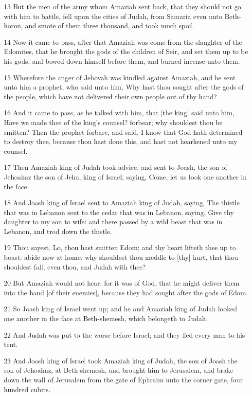 \par 13 But the men of the army whom Amaziah sent back, that they should not go with him to battle, fell upon the cities of Judah, from Samaria even unto Beth-horon, and smote of them three thousand, and took much spoil.
\par 14 Now it came to pass, after that Amaziah was come from the slaughter of the Edomites, that he brought the gods of the children of Seir, and set them up to be his gods, and bowed down himself before them, and burned incense unto them.
\par 15 Wherefore the anger of Jehovah was kindled against Amaziah, and he sent unto him a prophet, who said unto him, Why hast thou sought after the gods of the people, which have not delivered their own people out of thy hand?
\par 16 And it came to pass, as he talked with him, that [the king] said unto him, Have we made thee of the king's counsel? forbear; why shouldest thou be smitten? Then the prophet forbare, and said, I know that God hath determined to destroy thee, because thou hast done this, and hast not hearkened unto my counsel.
\par 17 Then Amaziah king of Judah took advice, and sent to Joash, the son of Jehoahaz the son of Jehu, king of Israel, saying, Come, let us look one another in the face.
\par 18 And Joash king of Israel sent to Amaziah king of Judah, saying, The thistle that was in Lebanon sent to the cedar that was in Lebanon, saying, Give thy daughter to my son to wife: and there passed by a wild beast that was in Lebanon, and trod down the thistle.
\par 19 Thou sayest, Lo, thou hast smitten Edom; and thy heart lifteth thee up to boast: abide now at home; why shouldest thou meddle to [thy] hurt, that thou shouldest fall, even thou, and Judah with thee?
\par 20 But Amaziah would not hear; for it was of God, that he might deliver them into the hand [of their enemies], because they had sought after the gods of Edom.
\par 21 So Joash king of Israel went up; and he and Amaziah king of Judah looked one another in the face at Beth-shemesh, which belongeth to Judah.
\par 22 And Judah was put to the worse before Israel; and they fled every man to his tent.
\par 23 And Joash king of Israel took Amaziah king of Judah, the son of Joash the son of Jehoahaz, at Beth-shemesh, and brought him to Jerusalem, and brake down the wall of Jerusalem from the gate of Ephraim unto the corner gate, four hundred cubits.
